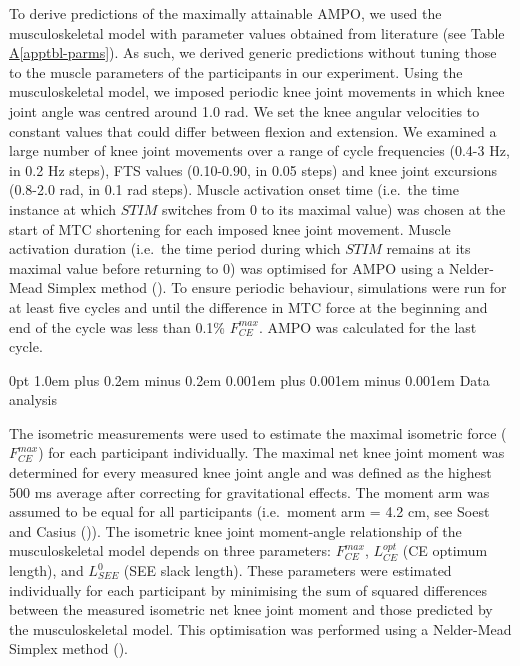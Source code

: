 \documentclass[
  11pt,
  a4paper]{article}
\makeatletter
\renewcommand{\subsection}{%
  \@startsection{subsection}{2}
    {0pt} 					%
    {1.0em plus 0.2em minus 0.2em} 	%
    {0.001em plus 0.001em minus 0.001em}    	%
    {\large\bfseries\sffamily}%
}
\newcommand*\quartoapptblref[1]{Table \hyperref[#1]{A\ref{#1}}}
\makeatother
\begin{document}
To derive predictions of the maximally attainable AMPO, we used the
musculoskeletal model with parameter values obtained from literature
(see \quartoapptblref{apptbl-parms}). As such, we derived generic
predictions without tuning those to the muscle parameters of the
participants in our experiment. Using the musculoskeletal model, we
imposed periodic knee joint movements in which knee joint angle was
centred around 1.0 rad. We set the knee angular velocities to constant
values that could differ between flexion and extension. We examined a
large number of knee joint movements over a range of cycle frequencies
(0.4-3 Hz, in 0.2 Hz steps), FTS values (0.10-0.90, in 0.05 steps) and
knee joint excursions (0.8-2.0 rad, in 0.1 rad steps). Muscle activation
onset time (i.e.~the time instance at which \(STIM\) switches from 0 to
its maximal value) was chosen at the start of MTC shortening for each
imposed knee joint movement. Muscle activation duration (i.e.~the time
period during which \(STIM\) remains at its maximal value before
returning to 0) was optimised for AMPO using a Nelder-Mead Simplex
method (). To ensure periodic behaviour, simulations were run for at least
five cycles and until the difference in MTC force at the beginning and
end of the cycle was less than 0.1\% \(F_{CE}^{max}\). AMPO was
calculated for the last cycle.

\subsection{Data analysis}\label{sec-m-analysis}

The isometric measurements were used to estimate the maximal isometric
force (\(F_{CE}^{max}\)) for each participant individually. The maximal
net knee joint moment was determined for every measured knee joint angle
and was defined as the highest 500 ms average after correcting for
gravitational effects. The moment arm was assumed to be equal for all
participants (i.e.~moment arm = 4.2 cm, see Soest and Casius
()). The isometric knee joint
moment-angle relationship of the musculoskeletal model depends on three
parameters: \(F_{CE}^{max}\), \(L_{CE}^{opt}\) (CE optimum length), and
\(L_{SEE}^0\) (SEE slack length). These parameters were estimated
individually for each participant by minimising the sum of squared
differences between the measured isometric net knee joint moment and
those predicted by the musculoskeletal model. This optimisation was
performed using a Nelder-Mead Simplex method
().
\end{document}
